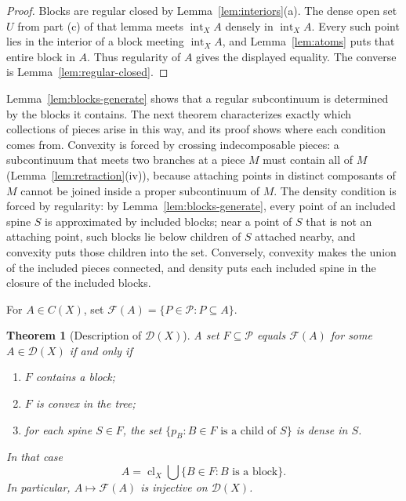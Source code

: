\documentclass[11pt]{amsart}
\newtheorem{theorem}{Theorem}[section]
\theoremstyle{definition}
\theoremstyle{remark}
\newcommand{\clX}{\operatorname{cl}_X}
\newcommand{\intX}{\operatorname{int}_X}
\newcommand{\D}{\mathcal{D}}
\newcommand{\Pc}{\mathcal{P}}
\newcommand{\Fc}{\mathcal{F}}
\begin{document}
\begin{proof}
Blocks are regular closed by Lemma~\ref{lem:interiors}(a). The dense open set $U$ from part (c) of that lemma meets $\intX A$ densely in $\intX A$. Every such point lies in the interior of a block meeting $\intX A$, and Lemma~\ref{lem:atoms} puts that entire block in $A$. Thus regularity of $A$ gives the displayed equality. The converse is Lemma~\ref{lem:regular-closed}.
\end{proof}

Lemma~\ref{lem:blocks-generate} shows that a regular subcontinuum is determined by the blocks it contains. The next theorem characterizes exactly which collections of pieces arise in this way, and its proof shows where each condition comes from. Convexity is forced by crossing indecomposable pieces: a subcontinuum that meets two branches at a piece $M$ must contain all of $M$ (Lemma~\ref{lem:retraction}(iv)), because attaching points in distinct composants of $M$ cannot be joined inside a proper subcontinuum of $M$. The density condition is forced by regularity: by Lemma~\ref{lem:blocks-generate}, every point of an included spine $S$ is approximated by included blocks; near a point of $S$ that is not an attaching point, such blocks lie below children of $S$ attached nearby, and convexity puts those children into the set. Conversely, convexity makes the union of the included pieces connected, and density puts each included spine in the closure of the included blocks.

For $A\in C(X)$, set $\Fc(A)=\{P\in\Pc: P\subseteq A\}$.

\begin{theorem}[Description of $\D(X)$]\label{thm:description}
A set $F\subseteq\Pc$ equals $\Fc(A)$ for some $A\in\D(X)$ if and only if
\begin{enumerate}[label=\textup{(\alph*)}]
\item $F$ contains a block;
\item $F$ is convex in the tree;
\item for each spine $S\in F$, the set $\{p_B: B\in F\text{ is a child of }S\}$ is dense in $S$.
\end{enumerate}
In that case
\[
A=\clX\bigcup\{B\in F: B\text{ is a block}\}.
\]
In particular, $A\mapsto\Fc(A)$ is injective on $\D(X)$.
\end{theorem}
\end{document}
